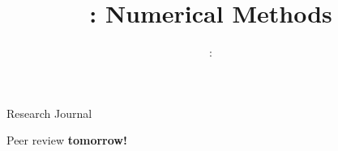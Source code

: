 \usepackage{../../beamerthemeFalmouthGamesAcademy}
\usepackage{multimedia}
\graphicspath{ {../../} }

\lstset{language=Python}

\usepackage[normalem]{ulem}
\usepackage{wasysym}

\usepackage{pdfpages}


\usepackage{algpseudocode}
\usepackage{qtree}




\title{\sessionnumber: Numerical Methods}
\subtitle{\modulecode: \moduletitle}

\frame{\titlepage} 

\begin{frame}{Research Journal}
	\begin{center}
		Peer review \textbf{tomorrow!}
	\end{center}
\end{frame}





